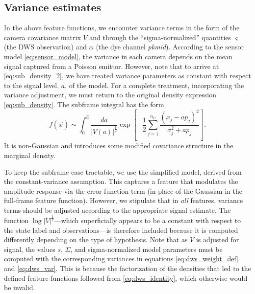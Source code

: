 \documentclass[10pt]{article}
\newcommand{\half}{\frac{1}{2}}
\newcommand{\dws}{{\small DWS}}
\begin{document}
\subsection{Variance estimates}
\label{sec:variance}


In the above feature functions, we encounter variance terms in the form of the camera covariance matrix $V$ and through the ``sigma-normalized'' quantities $\varsigma$ (the \dws{} observation) and $\alpha$ (the dye channel \emph{pkmid}).
According to the sensor model \eqref{eq:sensor_model}, the variance in each camera depends on the mean signal captured from a Poisson emittor.
However, note that to arrive at \eqref{eq:sub_density_2}, we have treated variance parameters as constant with respect to the signal level, $a$, of the model.
For a complete treatment, incorporating the variance adjustment, we must return to the original density expression \eqref{eq:sub_density}.
The subframe integral has the form
$$
f(\vec{x}) \sim \int_0^{\hat{a}} \frac{da}{|V(a)|^{\half}}\exp \left[ -\half \sum_{j=1}^{n_C} \frac{(x_j - ap_j)^2}{\sigma_j^2 + ap_j} \right].
$$
It is non-Gaussian and introduces some modified covariance structure in the marginal density.

To keep the subframe case tractable, we use the simplified model, derived from the constant-variance assumption.
This captures a feature that modulates the amplitude response via the error function term (in place of the Gaussian in the full-frame feature function).
However, we stipulate that in \emph{all} features, variance terms should be adjusted according to the appropriate signal estimate.
The function $\log |V|^\half$---which superficially appears to be a constant with respect to the state label and observations---is therefore included because it is computed differently depending on the type of hypothesis.
Note that as $V$ is adjusted for signal, the values $s$, $\Sigma$, and sigma-normalized model parameters must be computed with the corresponding variances in equations \eqref{eq:dws_weight_def} and \eqref{eq:dws_var}.
This is because the factorization of the densities that led to the defined feature functions followed from
\eqref{eq:dws_identity}, which otherwise would be invalid.
\end{document}
